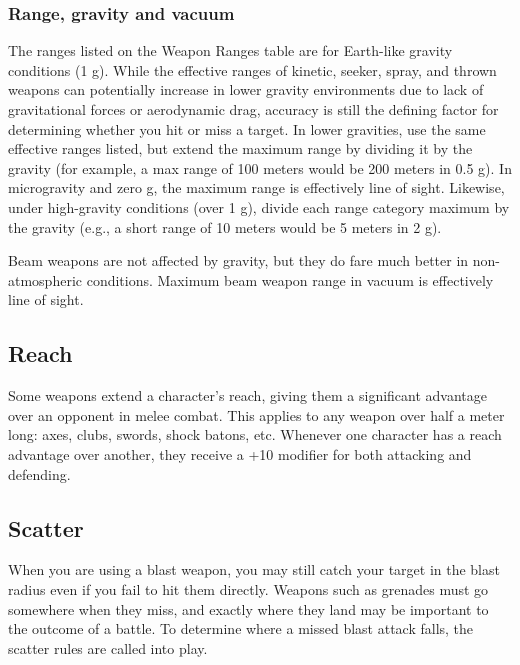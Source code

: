 \subsubsection{Range, gravity and vacuum} 

The ranges listed on the Weapon Ranges table are for Earth-like gravity conditions (1 g). While the effective ranges of kinetic, seeker, spray, and thrown weapons can potentially increase in lower gravity environments due to lack of gravitational forces or aerodynamic drag, accuracy is still the defining factor for determining whether you hit or miss a target. In lower gravities, use the same effective ranges listed, but extend the maximum range by dividing it by the gravity (for example, a max range of 100 meters would be 200 meters in 0.5 g). In microgravity and zero g, the maximum range is effectively line of sight. Likewise, under high-gravity conditions (over 1 g), divide each range category maximum by the gravity (e.g., a short range of 10 meters would be 5 meters in 2 g). 

Beam weapons are not affected by gravity, but they do fare much better in non-atmospheric conditions. Maximum beam weapon range in vacuum is effectively line of sight. 



\subsection{Reach} \label{sec:reach} 

Some weapons extend a character’s reach, giving them a significant advantage over an opponent in melee combat. This applies to any weapon over half a meter long: axes, clubs, swords, shock batons, etc. Whenever one character has a reach advantage over another, they receive a +10 modifier for both attacking and defending. 



\subsection{Scatter} \label{sec:scatter} 

When you are using a blast weapon, you may still catch your target in the blast radius even if you fail to hit them directly. Weapons such as grenades must go somewhere when they miss, and exactly where they land may be important to the outcome of a battle. To determine where a missed blast attack falls, the scatter rules are called into play. 

